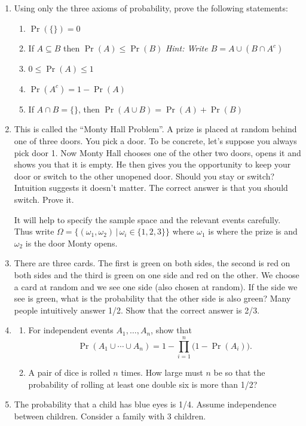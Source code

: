 \documentclass[
]{book}
\providecommand{\tightlist}{%
  \setlength{\itemsep}{0pt}\setlength{\parskip}{0pt}}
\theoremstyle{definition}
\theoremstyle{definition}
\theoremstyle{definition}
\theoremstyle{definition}
\theoremstyle{remark}
\begin{document}
\begin{enumerate}
\def\labelenumi{\arabic{enumi}.}
\item
  Using only the three axioms of probability, prove the following statements:

  \begin{enumerate}
  \def\labelenumii{(\alph{enumii})}
  \tightlist
  \item
    \(\Pr(\{\})=0\)
  \item
    If \(A \subseteq B\) then \(\Pr(A) \leq \Pr(B)\) \emph{Hint: Write \(B = A \cup (B \cap A^c)\)}
  \item
    \(0 \leq \Pr(A) \leq 1\)
  \item
    \(\Pr(A^c)=1-\Pr(A)\)
  \item
    If \(A \cap B = \{\}\), then \(\Pr(A\cup B) = \Pr(A) + \Pr(B)\)
  \end{enumerate}
\item
  This is called the ``Monty Hall Problem''. A prize is placed at random behind one of three doors. You pick a door. To be concrete, let's suppose you always pick door 1. Now Monty Hall chooses one of the other two doors, opens it and shows you that it is empty. He then gives you the opportunity to keep your door or switch to the other unopened door. Should you stay or switch? Intuition suggests it doesn't matter. The correct answer is that you should switch. Prove it.

  It will help to specify the sample space and the relevant events carefully. Thus write \(\Omega = \big\{(\omega_1,\omega_2) \,|\, \omega_i \in \{1,2,3\}\big\}\) where \(\omega_1\) is where the prize is and \(\omega_2\) is the door Monty opens.
\item
  There are three cards. The first is green on both sides, the second is red on both sides and the third is green on one side and red on the other. We choose a card at random and we see one side (also chosen at random). If the side we see is green, what is the probability that the other side is also green? Many people intuitively answer 1/2. Show that the correct answer is 2/3.
\item
  \begin{enumerate}
  \def\labelenumii{(\alph{enumii})}
  \item
    For independent events \(A_1,\dots,A_n\), show that
    \[\Pr(A_1 \cup \cdots \cup A_n) = 1 - \prod_{i=1}^n \big(1 - \Pr(A_i)\big).\]
  \item
    A pair of dice is rolled \(n\) times. How large must \(n\) be so that the probability of rolling at least one double six is more than 1/2?
  \end{enumerate}
\item
  The probability that a child has blue eyes is 1/4. Assume independence between children. Consider a family with 3 children.


\end{enumerate}
\end{document}
